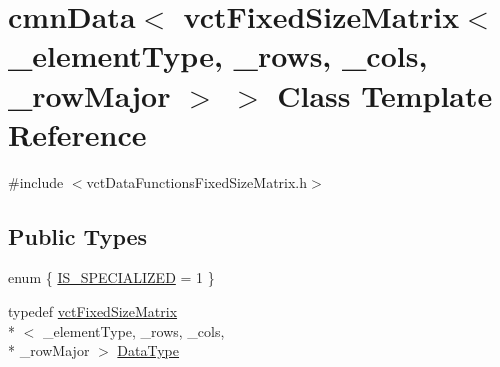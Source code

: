 \hypertarget{classcmn_data_3_01vct_fixed_size_matrix_3_01__element_type_00_01__rows_00_01__cols_00_01__row_major_01_4_01_4}{\section{cmn\-Data$<$ vct\-Fixed\-Size\-Matrix$<$ \-\_\-element\-Type, \-\_\-rows, \-\_\-cols, \-\_\-row\-Major $>$ $>$ Class Template Reference}
\label{classcmn_data_3_01vct_fixed_size_matrix_3_01__element_type_00_01__rows_00_01__cols_00_01__row_major_01_4_01_4}
}


{\ttfamily \#include $<$vct\-Data\-Functions\-Fixed\-Size\-Matrix.\-h$>$}

\subsection*{Public Types}
\begin{DoxyCompactItemize}
\item 
enum \{ \hyperlink{classcmn_data_3_01vct_fixed_size_matrix_3_01__element_type_00_01__rows_00_01__cols_00_01__row_major_01_4_01_4_a7bfca2e5f37f76366040c33d76a84f5dae5084c557350696eaba83eb9bbb3c29f}{I\-S\-\_\-\-S\-P\-E\-C\-I\-A\-L\-I\-Z\-E\-D} = 1
 \}
\item 
typedef \hyperlink{classvct_fixed_size_matrix}{vct\-Fixed\-Size\-Matrix}\\*
$<$ \-\_\-element\-Type, \-\_\-rows, \-\_\-cols, \\*
\-\_\-row\-Major $>$ \hyperlink{classcmn_data_3_01vct_fixed_size_matrix_3_01__element_type_00_01__rows_00_01__cols_00_01__row_major_01_4_01_4_a6b06110fd1bb7049b72ce21275dd8aee}{Data\-Type}
\end{DoxyCompactItemize}
